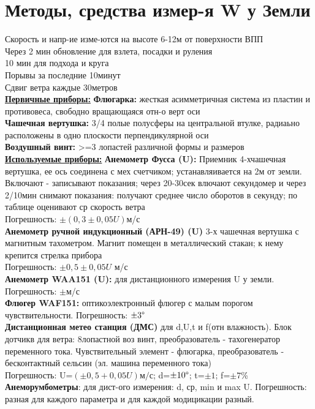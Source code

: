 
\section{Методы, средства измер-я W у Земли}
Скорость и напр-ие изме-ются на высоте 6-12м от поверхности ВПП\\
Через 2 мин обновление для взлета, посадки и руления\\
10 мин для подхода и круга\\
Порывы за последние 10минут\\
Сдвиг ветра каждые 30метров\\

\underline{\textbf{Первичные приборы:}}
\textbf{Флюгарка:} жесткая асимметричная система из пластин и противовеса, свободно вращающаяся отн-о верт оси\\
\textbf{Чашечная вертушка:} 3/4 полые полусферы на центральной втулке, радиаьно расположены в одно плоскости перпендикулярной оси\\
\textbf{Воздушный винт:} >=3 лопастей различной формы и размеров\\

\underline{\textbf{Используемые приборы:}}
\textbf{Анемометр Фусса (U):} Приемник 4-хчашечная вертушка, ее ось соединена с мех счетчиком; устанавляивается на 2м от земли. Включают - записывают показания; через 20-30сек влючают секундомер и через 2/10мин снимают показания: получают среднее число оборотов в секунду; по таблице оценивают ср скорость ветра\\
Погрешность: $\pm(0,3\pm0,05U)$м/с\\
\textbf{Анемометр ручной индукционный (АРН-49) (U)} 3-х чашечная вертушка с магнитным тахометром. Магнит помещен в металлический стакан;  к нему крепится стрелка прибора\\
Погрешность: $\pm0,5\pm0,05U$ м/с\\

\textbf{Анемометр WAA151 (U):} для дистанционного измерения U у земли. Погрешность: $\pm$м/с\\
\textbf{Флюгер WAF151:} оптикоэлектронный флюгер с малым порогом чувствительности. Погрешность: $\pm3\degree$\\

\textbf{Дистанционная метео станция (ДМС)} для d,U,t и f(отн влажность). Блок дотчикв для ветра: 8лопастной воз винт, преобразователь - тахогенератор переменного тока. Чувствительный элемент - флюгарка, преобразователь - бесконтактный сельсин (эл. машина переменного тока)\\
Погрешность: U=$(\pm0,5+0,05U)м/с$; d=$\pm10\degree$; t=$\pm1$; f=$\pm7$\%\\

\textbf{Анеморумбометры}: для дист-ого измерения: d, ср, min и max U. Погрешность: разная для каждого параметра и для каждой модицикации разный.




